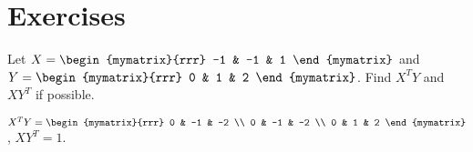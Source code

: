 \section*{Exercises}


\begin{ex}
  Let $X=\begin{mymatrix}{rrr}
    -1 & -1 & 1
  \end{mymatrix}$ and $Y=\begin{mymatrix}{rrr}
    0 & 1 & 2
  \end{mymatrix}$. Find $X^{T}Y$ and $XY^{T}$ if
  possible. 
  \begin{sol}
    $X^{T}Y = \begin{mymatrix}{rrr}
      0 & -1 & -2 \\
      0 & -1 & -2 \\
      0 & 1 & 2
    \end{mymatrix}$, $XY^{T} = 1$.
  \end{sol}
\end{ex}

